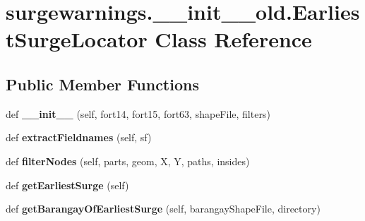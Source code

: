 \hypertarget{classsurgewarnings_1_1____init____old_1_1_earliest_surge_locator}{}\section{surgewarnings.\+\_\+\+\_\+init\+\_\+\+\_\+old.\+Earliest\+Surge\+Locator Class Reference}
\label{classsurgewarnings_1_1____init____old_1_1_earliest_surge_locator}
\subsection*{Public Member Functions}
\begin{DoxyCompactItemize}
\item 
\hypertarget{classsurgewarnings_1_1____init____old_1_1_earliest_surge_locator_ae00f4efc31994db51991f143aa7af196}{}def {\bfseries \+\_\+\+\_\+init\+\_\+\+\_\+} (self, fort14, fort15, fort63, shape\+File, filters)\label{classsurgewarnings_1_1____init____old_1_1_earliest_surge_locator_ae00f4efc31994db51991f143aa7af196}

\item 
\hypertarget{classsurgewarnings_1_1____init____old_1_1_earliest_surge_locator_a5aeca6aa7e277d168734b7ec77b79e20}{}def {\bfseries extract\+Fieldnames} (self, sf)\label{classsurgewarnings_1_1____init____old_1_1_earliest_surge_locator_a5aeca6aa7e277d168734b7ec77b79e20}

\item 
\hypertarget{classsurgewarnings_1_1____init____old_1_1_earliest_surge_locator_aa428584e9956b9f543762940a46b3556}{}def {\bfseries filter\+Nodes} (self, parts, geom, X, Y, paths, insides)\label{classsurgewarnings_1_1____init____old_1_1_earliest_surge_locator_aa428584e9956b9f543762940a46b3556}

\item 
\hypertarget{classsurgewarnings_1_1____init____old_1_1_earliest_surge_locator_a715bf70e4a1c76c627a940a8265b8a4e}{}def {\bfseries get\+Earliest\+Surge} (self)\label{classsurgewarnings_1_1____init____old_1_1_earliest_surge_locator_a715bf70e4a1c76c627a940a8265b8a4e}

\item 
\hypertarget{classsurgewarnings_1_1____init____old_1_1_earliest_surge_locator_ad513194b425e8e308ef91325a7b77fb2}{}def {\bfseries get\+Barangay\+Of\+Earliest\+Surge} (self, barangay\+Shape\+File, directory)\label{classsurgewarnings_1_1____init____old_1_1_earliest_surge_locator_ad513194b425e8e308ef91325a7b77fb2}

\end{DoxyCompactItemize}
